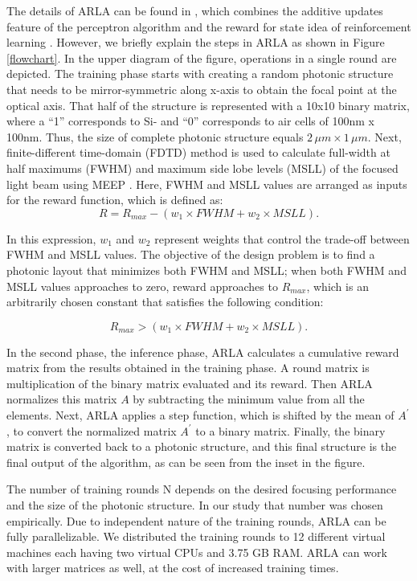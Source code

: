 \documentclass[9pt,twocolumn,twoside]{article}
\begin{document}
  The details of ARLA can be found in \cite{Cagri2017}, which combines the additive updates feature of the perceptron algorithm \cite{Rosenblatt1958} and the reward for state idea of reinforcement learning \cite{Sutton1998}. However, we briefly explain the steps in ARLA as shown in Figure \ref{flowchart}. In the upper diagram of the figure, operations in a single round are depicted. The training phase starts with creating a random photonic structure that needs to be mirror-symmetric along x-axis to obtain the focal point at the optical axis. That half of the structure is represented with a 10x10 binary matrix, where a “1” corresponds to Si- and “0” corresponds to air cells of 100nm x 100nm. Thus, the size of complete photonic structure equals $2 \, \mu m \times 1\, \mu m$. Next, finite-different time-domain (FDTD) method is used to calculate full-width at half maximums (FWHM) and maximum side lobe levels (MSLL) of the focused light beam using MEEP \cite{Oskooi2010}. Here, FWHM and MSLL values are arranged as inputs for the reward function, which is defined as: 
  \begin{equation}
    R=R_{max}-(w_1\times FWHM+w_2 \times MSLL).
  \end{equation}
  
  In this expression, $w_1$ and $w_2$ represent weights that control the trade-off between FWHM and MSLL values. The objective of the design problem is to find a photonic layout that minimizes both FWHM and MSLL; when both FWHM and MSLL values approaches to zero, reward approaches to $R_{max}$, which is an arbitrarily chosen constant that satisfies the following condition: 
  
  \begin{equation}
    R_{max} > (w_1\times FWHM+w_2 \times MSLL).
  \end{equation}

  In the second phase, the inference phase, ARLA calculates a cumulative reward matrix from the results obtained in the training phase. A round matrix is multiplication of the binary matrix evaluated and its reward. Then ARLA normalizes this matrix $A$ by subtracting the minimum value from all the elements. Next, ARLA applies a step function, which is shifted by the mean of $A^\prime$, to convert the normalized  matrix $A^\prime$ to a binary matrix. Finally, the binary matrix is converted back to a photonic structure, and this final structure is the final output of the algorithm, as can be seen from the inset in the figure.   
  
  The number of training rounds N depends on the desired focusing performance and the size of the photonic structure. In our study that number was chosen empirically. Due to independent nature of the training rounds, ARLA can be fully parallelizable. We distributed the training rounds to 12 different virtual machines each having two virtual CPUs and 3.75 GB RAM. ARLA can work with larger matrices as well, at the cost of increased training times. 
  
\end{document}
